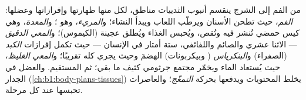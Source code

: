 \begin{proposition}\label{prop:b1:digestion-absorption:tract}
من الفم إلى الشرج ينقسم أنبوب الثدييات مناطق، لكل منها ظهارتها
وإفرازاتها وعضلها: \emph{الفم}، حيث تطحن الأسنان ويرطّب اللعاب
ويبدأ  النشاء؛ و\emph{المريء}، وهو ؛ و\emph{المعدة}، وهي
كيس حمضي تُنشر فيه  وتُقص، ويُحبس الغذاء ويُطلق عجينة
(الكيموس)؛ و\emph{المعي الدقيق} --- الاثنا عشري والصائم واللفائفي،
ستة أمتار في الإنسان --- حيث تكمل إفرازات \emph{الكبد} (الصفراء)
و\emph{البنكرياس} ( وبيكربونات) الهضمَ وحيث يجري 
كله تقريبًا؛ و\emph{المعي الغليظ}، حيث يُستعاد الماء ويخمّر مجتمع
جرثومي كثيف ما بقي؛ ثم المستقيم. والعضل في الجدار
(\cref{ch:b1:body-plans-tissues}) يخلط المحتويات ويدفعها
بحركة \emph{التمعّج}؛ والعاصرات تحبسها عند كل مرحلة.
\end{proposition}

